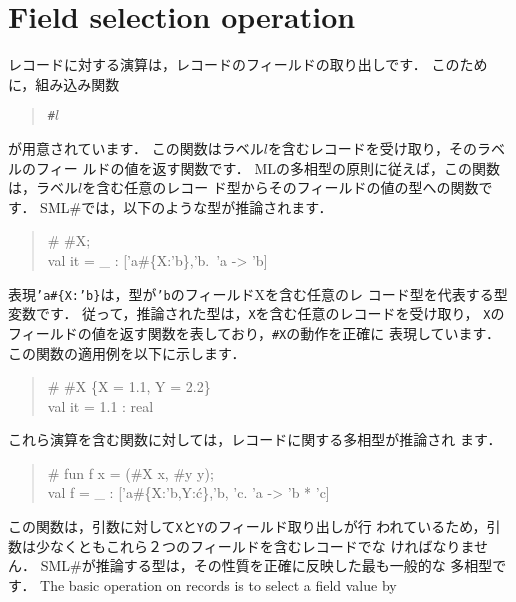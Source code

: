 \documentclass{jbook}
\newcommand{\txt}[2]{#2}
\newcommand{\smlsharp}{SML\#}
\begin{document}
\section{\txt{フィールド取り出し演算}{Field selection operation}}
\label{sec:extensionFieldselection}

\ifjp%
	レコードに対する演算は，レコードのフィールドの取り出しです．
	このために，組み込み関数
\begin{tt}\begin{quote}
{\tt \#$l$}
\end{quote}\end{tt}
が用意されています．
	この関数はラベル$l$を含むレコードを受け取り，そのラベルのフィー
ルドの値を返す関数です．
	MLの多相型の原則に従えば，この関数は，ラベル$l$を含む任意のレコー
ド型からそのフィールドの値の型への関数です．
	\smlsharp{}では，以下のような型が推論されます．
\begin{tt}\begin{quote}
\# \#X;\\
val it = \_ : ['a\#\{X:'b\},'b.~'a -> 'b]
\end{quote}\end{tt}
	表現{\tt 'a\#\{X:'b\}}は，型が{\tt 'b}のフィールドXを含む任意のレ
コード型を代表する型変数です．
	従って，推論された型は，{\tt X}を含む任意のレコードを受け取り，
{\tt X}のフィールドの値を返す関数を表しており，{\tt \#X}の動作を正確に
表現しています．
	この関数の適用例を以下に示します．
\begin{tt}\begin{quote}
\# \#X \{X = 1.1, Y = 2.2\}\\
val it = 1.1 : real
\end{quote}\end{tt}
	これら演算を含む関数に対しては，レコードに関する多相型が推論され
ます．
\begin{tt}\begin{quote}
\# fun f x = (\#X x, \#y y);\\
val f = \_ : ['a\#\{X:'b,Y:\'c\},'b, 'c. 'a -> 'b * 'c]
\end{quote}\end{tt}
	この関数は，引数に対して{\tt X}と{\tt Y}のフィールド取り出しが行
われているため，引数は少なくともこれら２つのフィールドを含むレコードでな
ければなりません．
	\smlsharp{}が推論する型は，その性質を正確に反映した最も一般的な
多相型です．
\else%
	The basic operation on records is to select a field value by
\end{document}
